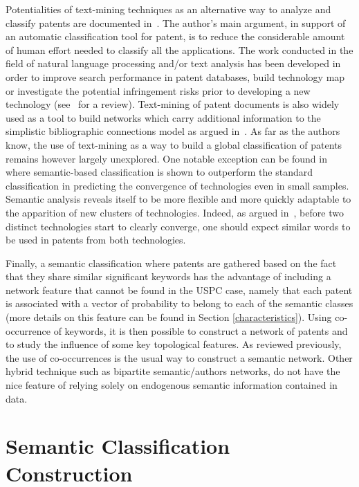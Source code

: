 \documentclass[article]{article}%
\begin{document}
Potentialities of text-mining techniques as an alternative way to analyze and classify patents are documented in~\citet{tseng2007text}. The author's main argument, in support of an automatic classification tool for patent, is to reduce the considerable amount of human effort needed to classify all the applications. The work conducted in the field of natural language processing and/or text analysis has been developed in order to improve search performance in patent databases, build technology map or investigate the potential infringement risks prior to developing a new technology (see~\citealt{abbas2014literature} for a review). Text-mining of patent documents is also widely used as a tool to build networks which carry additional information to the simplistic bibliographic connections model as argued in~\cite{yoon2004text}. As far as the authors know, the use of text-mining as a way to build a global classification of patents remains however largely unexplored. One notable exception can be found in~\cite{preschitschek2013} where semantic-based classification is shown to outperform the standard classification in predicting the convergence of technologies even in small samples. Semantic analysis reveals itself to be more flexible and more quickly adaptable to the apparition of new clusters of technologies. Indeed, as argued in~\citet{preschitschek2013}, before two distinct technologies start to clearly converge, one should expect similar words to be used in patents from both technologies.

Finally, a semantic classification where patents are gathered based on the fact that they share similar significant keywords has the advantage of including a network feature that cannot be found in the USPC case, namely that each patent is associated with a vector of probability to belong to each of the semantic classes (more details on this feature can be found in Section \ref{characteristics}). Using co-occurrence of keywords, it is then possible to construct a network of patents and to study the influence of some key topological features. As reviewed previously, the use of co-occurrences is the usual way to construct a semantic network. Other hybrid technique such as bipartite semantic/authors networks, do not have the nice feature of relying solely on endogenous semantic information contained in data.

\section{Semantic Classification Construction \label{keywords}}
\end{document}
